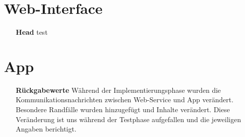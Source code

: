 \section{Web-Interface}
\begin{itemize}
\item [\textbf{Head}] test
\end{itemize}
\section{App}
\begin{itemize}
\item [\textbf{Rückgabewerte}] Während der Implementierungsphase wurden die Kommunikationsnachrichten zwischen Web-Service und App verändert. Besondere Randfälle wurden hinzugefügt und Inhalte verändert. Diese Veränderung ist uns während der Testphase aufgefallen und die jeweiligen Angaben berichtigt.
\end{itemize}